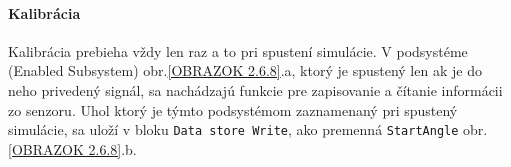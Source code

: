 \paragraph{Kalibrácia} 
Kalibrácia prebieha vždy len raz a to pri spustení simulácie. V podsystéme (Enabled Subsystem) obr.\ref{OBRAZOK 2.6.8}.a, ktorý je spustený len ak je do neho privedený signál, sa nachádzajú funkcie pre zapisovanie a čítanie informácii zo senzoru. Uhol ktorý je týmto podsystémom zaznamenaný pri spustený simulácie, sa uloží v bloku \verb|Data store Write|, ako premenná \verb|StartAngle| obr.\ref{OBRAZOK 2.6.8}.b.                                                                                                                                                                                                                                                                                                                                                                                                                                                                                                                                                                                                                                                                                                                                                                                                                                                                                                                                                                                                                                                                                                                                                                                                                                                                                                                                                                                                                                                                                                                                                                                                                                                                                                                                                                                                                                                                                                                                                                                                                                                                                                                                                                                                                                                                                                                                                                                                                                                                                                                                                                                                                                                                                                                                                                                                  